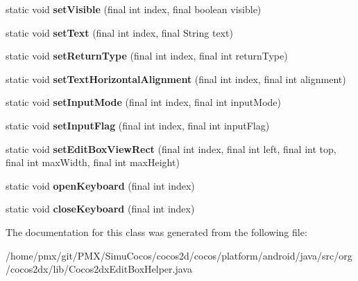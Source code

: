 \begin{DoxyCompactItemize}
static void {\bfseries set\+Visible} (final int index, final boolean visible)
\item 
\mbox{\label{classorg_1_1cocos2dx_1_1lib_1_1Cocos2dxEditBoxHelper_a3505dfac4fbd23a4661a5cb800370b10}} 
static void {\bfseries set\+Text} (final int index, final String text)
\item 
\mbox{\label{classorg_1_1cocos2dx_1_1lib_1_1Cocos2dxEditBoxHelper_abece66af5e9d56e0cf8cdfc6f4510738}} 
static void {\bfseries set\+Return\+Type} (final int index, final int return\+Type)
\item 
\mbox{\label{classorg_1_1cocos2dx_1_1lib_1_1Cocos2dxEditBoxHelper_ab7fca9c6b02cf95a80ea087ab8736b7e}} 
static void {\bfseries set\+Text\+Horizontal\+Alignment} (final int index, final int alignment)
\item 
\mbox{\label{classorg_1_1cocos2dx_1_1lib_1_1Cocos2dxEditBoxHelper_ac647f712c52b3612087851ee03d1abff}} 
static void {\bfseries set\+Input\+Mode} (final int index, final int input\+Mode)
\item 
\mbox{\label{classorg_1_1cocos2dx_1_1lib_1_1Cocos2dxEditBoxHelper_a0b319772b876facac91b90be69680bf7}} 
static void {\bfseries set\+Input\+Flag} (final int index, final int input\+Flag)
\item 
\mbox{\label{classorg_1_1cocos2dx_1_1lib_1_1Cocos2dxEditBoxHelper_a6596fd24fcafc2af40cc290050e51e1b}} 
static void {\bfseries set\+Edit\+Box\+View\+Rect} (final int index, final int left, final int top, final int max\+Width, final int max\+Height)
\item 
\mbox{\label{classorg_1_1cocos2dx_1_1lib_1_1Cocos2dxEditBoxHelper_a9c17af205eeebfd79461c7f2498f6c31}} 
static void {\bfseries open\+Keyboard} (final int index)
\item 
\mbox{\label{classorg_1_1cocos2dx_1_1lib_1_1Cocos2dxEditBoxHelper_ad98e92f3346201bfe9b35ec99d35cb7b}} 
static void {\bfseries close\+Keyboard} (final int index)
\end{DoxyCompactItemize}


The documentation for this class was generated from the following file\+:\begin{DoxyCompactItemize}
\item 
/home/pmx/git/\+P\+M\+X/\+Simu\+Cocos/cocos2d/cocos/platform/android/java/src/org/cocos2dx/lib/Cocos2dx\+Edit\+Box\+Helper.\+java\end{DoxyCompactItemize}
